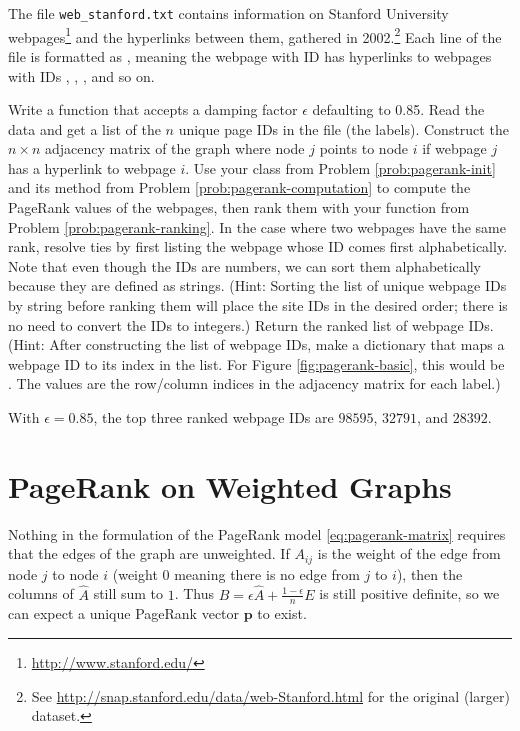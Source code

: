 \begin{problem} %
The file \texttt{web\_stanford.txt} contains information on Stanford University webpages\footnote{\url{http://www.stanford.edu/}} and the hyperlinks between them, gathered in 2002.\footnote{See \url{http://snap.stanford.edu/data/web-Stanford.html} for the original (larger) dataset.}
Each line of the file is formatted as , meaning the webpage with ID  has hyperlinks to webpages with IDs , , , and so on.

Write a function that accepts a damping factor $\epsilon$ defaulting to 0.85.
Read the data and get a list of the $n$ unique page IDs in the file (the labels).
Construct the $n\times n$ adjacency matrix of the graph where node $j$ points to node $i$ if webpage $j$ has a hyperlink to webpage $i$.
Use your class from Problem \ref{prob:pagerank-init} and its  method from Problem \ref{prob:pagerank-computation} to compute the PageRank values of the webpages, then rank them with your function from Problem \ref{prob:pagerank-ranking}. 
In the case where two webpages have the same rank, resolve ties by first listing the webpage whose ID comes first alphabetically. Note that even though the IDs are numbers, we can sort them alphabetically because they are defined as strings.
(Hint: Sorting the list of unique webpage IDs by string before ranking them will place the site IDs in the desired order; there is no need to convert the IDs to integers.) 
Return the ranked list of webpage IDs.
\\(Hint: After constructing the list of webpage IDs, make a dictionary that maps a webpage ID to its index in the list.
For Figure \ref{fig:pagerank-basic}, this would be .
The values are the row/column indices in the adjacency matrix for each label.)

With $\epsilon=0.85$, the top three ranked webpage IDs are $98595$, $32791$, and $28392$.
\end{problem}

\section*{PageRank on Weighted Graphs} %

Nothing in the formulation of the PageRank model \eqref{eq:pagerank-matrix} requires that the edges of the graph are unweighted.
If $A_{ij}$ is the weight of the edge from node $j$ to node $i$ (weight $0$ meaning there is no edge from $j$ to $i$), then the columns of $\widehat{A}$ still sum to $1$.
Thus $B = \epsilon \widehat{A} + \frac{1-\epsilon}{n}E$ is still positive definite, so we can expect a unique PageRank vector $\mathbf{p}$ to exist.

